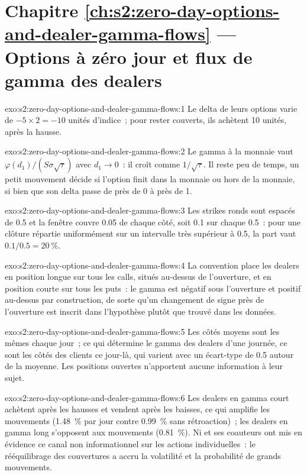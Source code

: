 \section*{Chapitre \ref{ch:s2:zero-day-options-and-dealer-gamma-flows} --- Options à zéro jour et flux de gamma des dealers}

\begin{solution}{exo:s2:zero-day-options-and-dealer-gamma-flows:1}
Le delta de leurs options varie de $-5 \times 2 = -10$ unités d'indice~; pour rester couverts, ils achètent 10 unités, après la hausse.
\end{solution}

\begin{solution}{exo:s2:zero-day-options-and-dealer-gamma-flows:2}
Le gamma à la monnaie vaut $\varphi(d_1)/(S\sigma\sqrt\tau)$ avec $d_1 \to 0$~: il croît comme $1/\sqrt\tau$. Il reste peu de temps, un petit mouvement décide
si l'option finit dans la monnaie ou hors de la monnaie, si bien que son delta passe de près de 0 à près de 1.
\end{solution}

\begin{solution}{exo:s2:zero-day-options-and-dealer-gamma-flows:3}
Les strikes ronds sont espacés de 0.5 et la fenêtre couvre 0.05 de chaque côté, soit 0.1 sur chaque 0.5~: pour une clôture répartie uniformément sur un intervalle très supérieur à 0.5, la
part vaut $0.1/0.5 = 20~\%$.
\end{solution}

\begin{solution}{exo:s2:zero-day-options-and-dealer-gamma-flows:4}
La convention place les dealers en position longue sur tous les calls, situés au-dessus de l'ouverture, et en position courte sur tous les puts~: le gamma est négatif sous l'ouverture et
positif au-dessus par construction, de sorte qu'un changement de signe près de l'ouverture est inscrit dans l'hypothèse plutôt que trouvé dans les données.
\end{solution}

\begin{solution}{exo:s2:zero-day-options-and-dealer-gamma-flows:5}
Les côtés moyens sont les mêmes chaque jour~; ce qui détermine le gamma des dealers d'une journée, ce sont les côtés des clients ce jour-là, qui varient avec un écart-type de
0.5 autour de la moyenne. Les positions ouvertes n'apportent aucune information à leur sujet.
\end{solution}

\begin{solution}{exo:s2:zero-day-options-and-dealer-gamma-flows:6}
Les dealers en gamma court achètent après les hausses et vendent après les baisses, ce qui amplifie les mouvements (1.48~\% par jour contre 0.99~\% sans rétroaction)~; les dealers en gamma long
s'opposent aux mouvements (0.81~\%). Ni et ses coauteurs ont mis en évidence ce canal non informationnel sur les actions individuelles~: le rééquilibrage des couvertures a accru la volatilité et
la probabilité de grands mouvements.
\end{solution}


